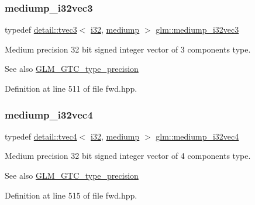 \subsubsection{\texorpdfstring{mediump\+\_\+i32vec3}{mediump\_i32vec3}}
{\footnotesize\ttfamily typedef \hyperlink{structglm_1_1detail_1_1tvec3}{detail\+::tvec3}$<$ \hyperlink{group__gtc__type__precision_ga1d8ed5c43e91ea7d4528389da4fa9524}{i32}, \hyperlink{namespaceglm_a0f04f086094c747d227af4425893f545a6416f3ea0c9025fb21ed50c4d6620482}{mediump} $>$ \hyperlink{group__gtc__type__precision_ga768e62b66086bd85a438341eedfad651}{glm\+::mediump\+\_\+i32vec3}}

Medium precision 32 bit signed integer vector of 3 components type. \begin{DoxySeeAlso}{See also}
\hyperlink{group__gtc__type__precision}{G\+L\+M\+\_\+\+G\+T\+C\+\_\+type\+\_\+precision} 
\end{DoxySeeAlso}


Definition at line 511 of file fwd.\+hpp.

\mbox{\label{group__gtc__type__precision_ga68126328090f37655d8218c5a5fb8ae5}} 
\subsubsection{\texorpdfstring{mediump\+\_\+i32vec4}{mediump\_i32vec4}}
{\footnotesize\ttfamily typedef \hyperlink{structglm_1_1detail_1_1tvec4}{detail\+::tvec4}$<$ \hyperlink{group__gtc__type__precision_ga1d8ed5c43e91ea7d4528389da4fa9524}{i32}, \hyperlink{namespaceglm_a0f04f086094c747d227af4425893f545a6416f3ea0c9025fb21ed50c4d6620482}{mediump} $>$ \hyperlink{group__gtc__type__precision_ga68126328090f37655d8218c5a5fb8ae5}{glm\+::mediump\+\_\+i32vec4}}

Medium precision 32 bit signed integer vector of 4 components type. \begin{DoxySeeAlso}{See also}
\hyperlink{group__gtc__type__precision}{G\+L\+M\+\_\+\+G\+T\+C\+\_\+type\+\_\+precision} 
\end{DoxySeeAlso}


Definition at line 515 of file fwd.\+hpp.

\mbox{\label{group__gtc__type__precision_ga90fedf6c701ffbe00535156715e50787}} 
